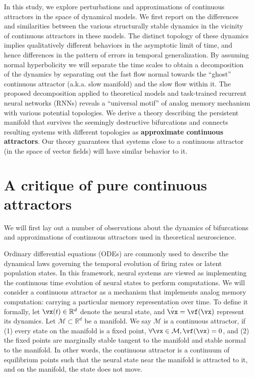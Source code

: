 \documentclass{article} %
\newcounter{ct}
\newcommand{\reals}{\mathbb{R}}
\newcommand{\manifold}{\mathcal{M}}
\theoremstyle{definition}
\theoremstyle{remark}
\renewcommand{\cite}{\citep}
\begin{document}
In this study, we explore perturbations and approximations of continuous attractors in the space of dynamical models.
We first report on the differences and similarities between the various structurally stable dynamics in the vicinity of continuous attractors in these models.
The distinct topology of these dynamics implies qualitatively different behaviors in the asymptotic limit of time, and hence differences in the pattern of errors in temporal generalization.
By assuming normal hyperbolicity we will separate the time scales to obtain a decomposition of the dynamics by separating out the fast flow normal towards the ``ghost'' continuous attractor (a.k.a. slow manifold) and the slow flow within it.
The proposed decomposition applied to theoretical models and task-trained recurrent neural networks (RNNs) reveals a ``universal motif'' of analog memory mechanism with various potential topologies.
We derive a theory describing the persistent manifold that survives the seemingly destructive bifurcations and connects resulting systems with different topologies as \textbf{approximate continuous attractors}.
Our theory guarantees that systems close to a continuous attractor (in the space of vector fields) will have similar behavior to it.


\section{A critique of pure continuous attractors}\label{sec:critique}
We will first lay out a number of observations about the dynamics of bifurcations and approximations of continuous attractors used in theoretical neuroscience.

Ordinary differential equations (ODEs) are commonly used to describe the dynamical laws governing the temporal evolution of firing rates or latent population states\cite{vyas2020}.
In this framework, neural systems are viewed as implementing the continuous time evolution of neural states to perform computations.
We will consider a continuous attractor as a mechanism that implements analog memory computation: carrying a particular memory representation over time.
To define it formally, let \(\vx(t) \in \reals^d\) denote the neural state, and \(\dot{\vx} = \vf(\vx)\) represent its dynamics.
Let \(\manifold \subset \reals^d\) be a manifold.
We say \(\manifold\) is a continuous attractor, if (1) every state on the manifold is a fixed point, \(\forall \vx \in \manifold, \vf(\vx) = 0\), and (2) the fixed points are marginally stable tangent to the manifold and stable normal to the manifold.
In other words, the continuous attractor is a continuum of equilibrium points such that the neural state near the manifold is attracted to it, and on the manifold, the state does not move.
\end{document}
